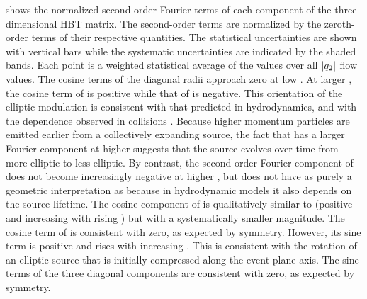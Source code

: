 \Fig{\ref{fig:uw_vs_kt}} shows the normalized second-order Fourier terms of each component of the three-dimensional HBT matrix.
The second-order terms are normalized by the zeroth-order terms of their respective quantities.
The statistical uncertainties are shown with vertical bars while the systematic uncertainties are indicated by the shaded bands.
Each point is a weighted statistical average of the values over all $|q_{2}|$ flow values.
The cosine terms of the diagonal radii approach zero at low \kt.
At larger \kt, the cosine term of \Rside is positive while that of \Rout is negative.
This orientation of the elliptic modulation is consistent with that predicted in hydrodynamics, and with the \kt dependence observed in \PbPb collisions \cite{Adamova:2017opl}.
Because higher momentum particles are emitted earlier from a collectively expanding source, the fact that \Rside has a larger Fourier component at higher \kt suggests that the source evolves over time from more elliptic to less elliptic.
By contrast, the second-order Fourier component of \Rout does not become increasingly negative at higher \kt, but \Rout does not have as purely a geometric interpretation as \Rside because in hydrodynamic models it also depends on the source lifetime.
The cosine component of \Rlong is qualitatively similar to \Rside (positive and increasing with rising \kt) but with a systematically smaller magnitude.
The cosine term of \Ros is consistent with zero, as expected by symmetry.
However, its sine term is positive and rises with increasing \kt.
This is consistent with the rotation of an elliptic source that is initially compressed along the event plane axis.
The sine terms of the three diagonal components are consistent with zero, as expected by symmetry.
